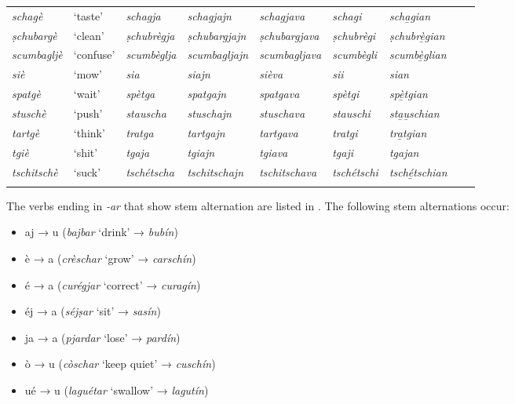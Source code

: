 \begin{sidewaystable}
\begin{tabularx}{\textwidth}{lllllllll}
		\textit{schagè} & `taste' & \textit{schagja} & \textit{schagjajn} & \textit{schagjava} & \textit{schagi} & \textit{scha̱gian}\\
		\textit{ṣchubargè} & `clean' & \textit{ṣchubrègja} & \textit{ṣchubargjajn} & \textit{ṣchubargjava} & \textit{ṣchubrègi} & \textit{ṣchubrè̱gian} \\
		\textit{scumbagljè} & `confuse' & \textit{scumbèglja} & \textit{scumbagljajn} & \textit{scumbagljava} & \textit{scumbègli} & \textit{scumbè̱glian}\\
		\textit{siè} & `mow' & \textit{sia} & \textit{siajn} & \textit{sièva} & \textit{sii} & \textit{sian}\\
		\textit{spatgè} & `wait' & \textit{spètga} & \textit{spatgajn} & \textit{spatgava} & \textit{spètgi} & \textit{spè̱tgian}\\
		\textit{stuschè} & `push' & \textit{stauscha} & \textit{stuschajn} & \textit{stuschava} & \textit{stauschi} & \textit{sta̱u̱schian}\\
		\textit{tartgè} & `think' & \textit{tratga} & \textit{tartgajn} & \textit{tartgava} & \textit{tratgi} & \textit{tra̱tgian}\\
		\textit{tgiè} & `shit' & \textit{tgaja} & \textit{tgiajn} & \textit{tgiava} & \textit{tgaji} & \textit{tgajan}\\
		\textit{tschitschè} & `suck' & \textit{tschétscha} & \textit{tschitschajn} & \textit{tschitschava} & \textit{tschétschi} & \textit{tsché̱tschian} \\
		
		\lspbottomrule
	\end{tabularx} 
\end{sidewaystable}

The verbs ending in \textit{-ar} that show stem alternation are listed in . The following stem alternations occur:
 
 \begin{itemize}
 	\item aj → u (\textit{bajbar} `drink' → \textit{bubín})
 	\item è → a (\textit{crèschar} `grow' → \textit{carschín})
 	\item é → a (\textit{curégjar} `correct' → \textit{curagín})
 	\item éj → a (\textit{séjṣar} `sit' → \textit{sasín})
 	\item ja → a (\textit{pjardar} `lose' → \textit{pardín})
 	\item ò → u (\textit{còschar} `keep quiet' → \textit{cuschín})
 	\item ué → u (\textit{laguétar} `swallow' → \textit{lagutín})
 	 \end{itemize}

